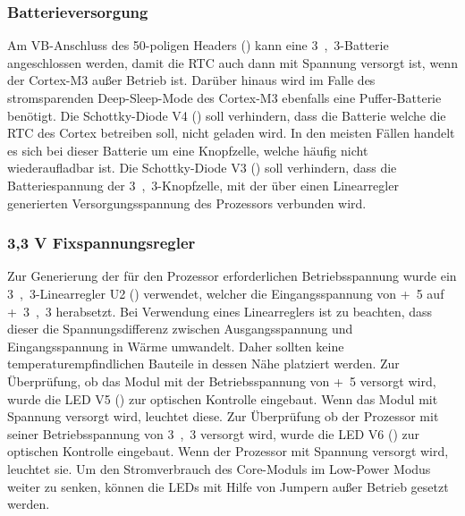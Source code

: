 \subsubsection{Batterieversorgung}
Am VB-Anschluss des 50-poligen Headers () kann eine \unit{3,3}{\volt}-Batterie angeschlossen werden, damit die \gls{RTC} auch dann mit Spannung versorgt ist, wenn der Cortex-M3 außer Betrieb ist. Darüber hinaus wird im Falle des stromsparenden Deep-Sleep-Mode des Cortex-M3 ebenfalls eine Puffer-Batterie benötigt. Die Schottky-Diode V4 () soll verhindern, dass die Batterie welche die \gls{RTC} des Cortex betreiben soll, nicht geladen wird. In den meisten Fällen handelt es sich bei dieser Batterie um eine Knopfzelle, welche häufig nicht wiederaufladbar ist. Die Schottky-Diode V3 () soll verhindern, dass die Batteriespannung der \unit{3,3}{\volt}-Knopfzelle, mit der über einen Linearregler generierten Versorgungsspannung des Prozessors verbunden wird.


\subsubsection{3,3 V Fixspannungsregler}
Zur Generierung der für den Prozessor erforderlichen Betriebsspannung wurde ein \unit{3,3}{\volt}-Linearregler U2 () verwendet, welcher die Eingangsspannung von \unit{+5}{\volt} auf \unit{+3,3}{\volt} herabsetzt. Bei Verwendung eines Linearreglers ist zu beachten, dass dieser die Spannungsdifferenz zwischen Ausgangsspannung und Eingangsspannung in Wärme umwandelt. Daher sollten keine temperaturempfindlichen Bauteile in dessen Nähe platziert werden. Zur Überprüfung, ob das Modul mit der Betriebsspannung von \unit{+5}{\volt} versorgt wird, wurde die LED V5 () zur optischen Kontrolle eingebaut. Wenn das Modul mit Spannung versorgt wird, leuchtet diese. Zur Überprüfung ob der Prozessor mit seiner Betriebsspannung von \unit{3,3}{\volt} versorgt wird, wurde die LED V6 () zur optischen Kontrolle eingebaut. Wenn der Prozessor mit Spannung versorgt wird, leuchtet sie. Um den Stromverbrauch des \gls{Core-Modul}s im Low-Power Modus weiter zu senken, können die LEDs mit Hilfe von Jumpern außer Betrieb gesetzt werden.

